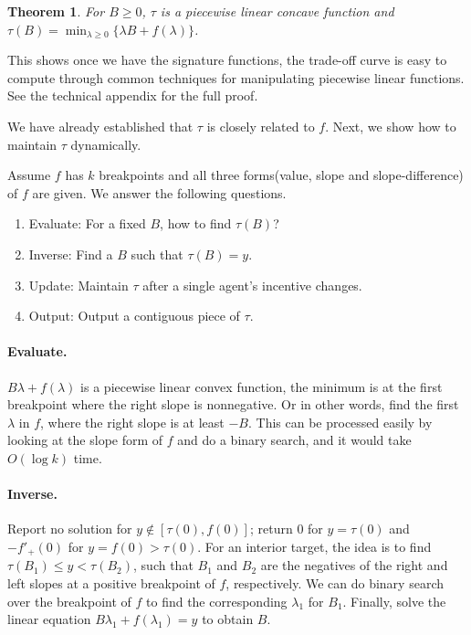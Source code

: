 \documentclass{article}
\newcommand{\lps}{\tau}
\newtheorem{theorem}{Theorem}
\begin{document}
\begin{theorem}\label{thm:lps}
    For $B\geq 0$, $\tau$ is a piecewise linear concave function and $\tau(B) = \min_{\lambda\geq 0} \{\lambda B+f(\lambda)\}$.
\end{theorem}

This shows once we have the signature functions, the trade-off curve is easy to compute through common techniques for manipulating piecewise linear functions. See the technical appendix for the full proof.

We have already established that $\lps$ is closely related to $f$. Next, we show how to maintain $\lps$ dynamically.

Assume $f$ has $k$ breakpoints and all three forms(value, slope and slope-difference) of $f$ are given. We answer the following questions.

\begin{enumerate}
    \item Evaluate: For a fixed $B$, how to find $\lps(B)$? 
    \item Inverse: Find a $B$ such that $\lps(B)=y$.
    \item Update: Maintain $\lps$ after a single agent's incentive changes. 
    \item Output: Output a contiguous piece of $\lps$.
\end{enumerate}


\paragraph{Evaluate.} $B\lambda + f(\lambda)$ is a piecewise linear convex function, the minimum is at the first breakpoint where the right slope is nonnegative. Or in other words, find the first $\lambda$ in $f$, where the right slope is at least $-B$. This can be processed easily by looking at the slope form of $f$ and do a binary search, and it would take $O(\log k)$ time.

\paragraph{Inverse.} Report no solution for $y\notin[\lps(0),f(0)]$; return $0$ for $y=\lps(0)$ and $-f'_+(0)$ for $y=f(0)>\lps(0)$. For an interior target, the idea is to find $\lps(B_1)\leq y< \lps(B_2)$, such that $B_1$ and $B_2$ are the negatives of the right and left slopes at a positive breakpoint of $f$, respectively. We can do binary search over the breakpoint of $f$ to find the corresponding $\lambda_1$ for $B_1$. Finally, solve the linear equation $B\lambda_1 + f(\lambda_1) = y$ to obtain $B$.
\end{document}
